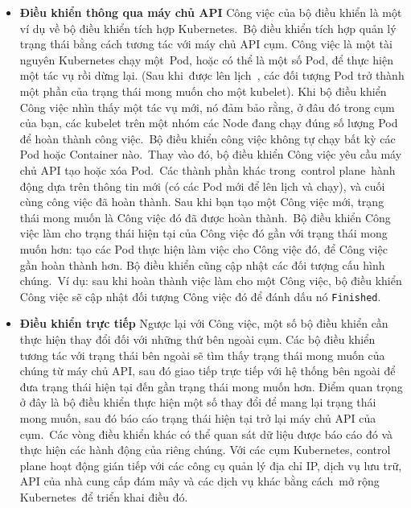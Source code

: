 \documentclass[12pt,a4paper]{report}
\begin{document}
	\begin{itemize}
		\item \textbf{Điều khiển thông qua máy chủ API}
		\smallskip
		\subitem Công việc của bộ điều khiển là một ví dụ về bộ điều khiển tích hợp Kubernetes. Bộ điều khiển tích hợp quản lý trạng thái bằng cách tương tác với máy chủ API cụm.
		\smallskip
		\subitem Công việc là một tài nguyên Kubernetes chạy một Pod, hoặc có thể là một số Pod, để thực hiện một tác vụ rồi dừng lại.
		\smallskip
		\subitem (Sau khi được lên lịch , các đối tượng Pod trở thành một phần của trạng thái mong muốn cho một kubelet).
		\smallskip
		\subitem Khi bộ điều khiển Công việc nhìn thấy một tác vụ mới, nó đảm bảo rằng, ở đâu đó trong cụm của bạn, các kubelet trên một nhóm các Node đang chạy đúng số lượng Pod để hoàn thành công việc. Bộ điều khiển công việc không tự chạy bất kỳ các Pod hoặc Container nào. Thay vào đó, bộ điều khiển Công việc yêu cầu máy chủ API tạo hoặc xóa Pod. Các thành phần khác trong control plane hành động dựa trên thông tin mới (có các Pod mới để lên lịch và chạy), và cuối cùng công việc đã hoàn thành.
		\smallskip
		\subitem Sau khi bạn tạo một Công việc mới, trạng thái mong muốn là Công việc đó đã được hoàn thành. Bộ điều khiển Công việc làm cho trạng thái hiện tại của Công việc đó gần với trạng thái mong muốn hơn: tạo các Pod thực hiện làm việc cho Công việc đó, để Công việc gần hoàn thành hơn.
		\smallskip
		\subitem Bộ điều khiển cũng cập nhật các đối tượng cấu hình chúng. Ví dụ: sau khi hoàn thành việc làm cho một Công việc, bộ điều khiển Công việc sẽ cập nhật đối tượng Công việc đó để đánh dấu nó \texttt{Finished}.
		
		\item \textbf{Điều khiển trực tiếp}
		\smallskip
		\subitem Ngược lại với Công việc, một số bộ điều khiển cần thực hiện thay đổi đối với những thứ bên ngoài cụm.
		\smallskip
		\subitem Các bộ điều khiển tương tác với trạng thái bên ngoài sẽ tìm thấy trạng thái mong muốn của chúng từ máy chủ API, sau đó giao tiếp trực tiếp với hệ thống bên ngoài để đưa trạng thái hiện tại đến gần trạng thái mong muốn hơn.
		\smallskip
		\subitem Điểm quan trọng ở đây là bộ điều khiển thực hiện một số thay đổi để mang lại trạng thái mong muốn, sau đó báo cáo trạng thái hiện tại trở lại máy chủ API của cụm. Các vòng điều khiển khác có thể quan sát dữ liệu được báo cáo đó và thực hiện các hành động của riêng chúng.
		\smallskip
		\subitem Với các cụm Kubernetes, control plane hoạt động gián tiếp với các công cụ quản lý địa chỉ IP, dịch vụ lưu trữ, API của nhà cung cấp đám mây và các dịch vụ khác bằng cách mở rộng Kubernetes để triển khai điều đó.
	\end{itemize}
\end{document}
